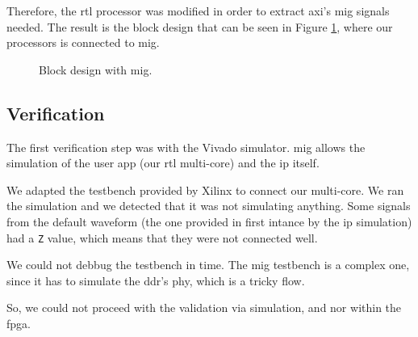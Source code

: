 Therefore, the \gls{rtl} processor was modified in order to extract \gls{axi}'s \gls{mig} signals needed. 
The result is the block design that can be seen in Figure \ref{fig:bd_mig}, where our processors is connected to \gls{mig}.

    \begin{figure}
        \centering
        \caption{Block design with \gls{mig}.}
        \label{fig:bd_mig}
    \end{figure}

\subsection{Verification}
The first verification step was with the Vivado simulator. 
\gls{mig} allows the simulation of the user app (our \gls{rtl} multi-core) and the \gls{ip} itself.

We adapted the testbench provided by Xilinx to connect our multi-core. 
We ran the simulation and we detected that it was not simulating anything.
Some signals from the default waveform (the one provided in first intance by the \gls{ip} simulation) had a \texttt{Z} value, which means that they were not connected well.

We could not debbug the testbench in time.
The \gls{mig} testbench is a complex one, since it has to simulate the \gls{ddr}'s \gls{phy}, which is a tricky flow.

So, we could not proceed with the validation via simulation, and nor within the \gls{fpga}.

